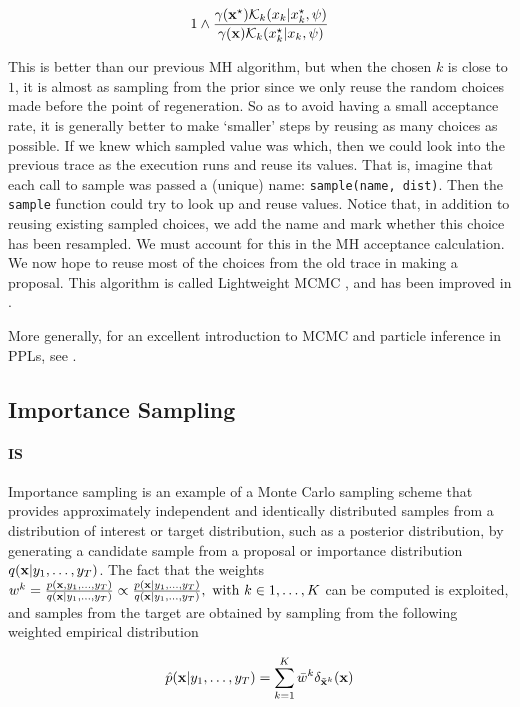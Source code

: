 $$ 1 \wedge \frac{\gamma(\boldsymbol{\mathbf{x}}^\star) \mathcal{K}_k(x_k|x_k^\star, \psi)}{\gamma(\boldsymbol{\mathbf{x}}) \mathcal{K}_k(x_k^\star|x_k, \psi)} $$

This is better than our previous \gls{MH} algorithm, but when the chosen $k$ is close to $1$, it is almost as sampling from the prior since we only reuse the random choices made before the point of regeneration. So as to avoid having a small acceptance rate, it is generally better to make ‘smaller’ steps by reusing as many choices as possible. If we knew which sampled value was which, then we could look into the previous trace as the execution runs and reuse its values. That is, imagine that each call to sample was passed a (unique) name: \texttt{sample(name, dist)}. Then the \texttt{sample} function could try to look up and reuse values.
Notice that, in addition to reusing existing sampled choices, we add the name and mark whether this choice has been resampled. We must account for this in the \gls{MH} acceptance calculation.
We now hope to reuse most of the choices from the old trace in making a proposal.
This algorithm is called Lightweight \gls{MCMC} \cite{Wingate:2011ul}, and has been improved in \cite{Ritchie:2015tx}.

More generally, for an excellent introduction to \gls{MCMC} and particle inference in \gls{PPL}s, see \cite{dippl}.


\subsection{Importance Sampling}

\paragraph{\gls{IS}}
Importance sampling is an example of a Monte Carlo sampling scheme that provides approximately independent and identically distributed samples from a distribution of interest or target distribution, such as a posterior distribution, by generating a candidate sample from a proposal or importance distribution $q(\boldsymbol{\mathbf{x}}|y_1,\dots,y_T)$.
The fact that the weights 
$w^k = \frac{p(\boldsymbol{\mathbf{x}}, y_1,\dots,y_T)}{q(\boldsymbol{\mathbf{x}}|y_1,\dots,y_T)} \propto \frac{p(\boldsymbol{\mathbf{x}}|y_1,\dots,y_T)}{q(\boldsymbol{\mathbf{x}}|y_1,\dots,y_T)}, \ \text{with} \ k \in 1,\dots,K$ can be computed is exploited, and samples from the target are obtained by sampling from the following weighted empirical distribution

$$ \hat{p}(\boldsymbol{\mathbf{x}}|y_1,\dots,y_T) = \sum_{k=1}^K \bar{w}^k \delta_{\tilde{\boldsymbol{\mathbf{x}}}^k} (\boldsymbol{\mathbf{x}})$$

